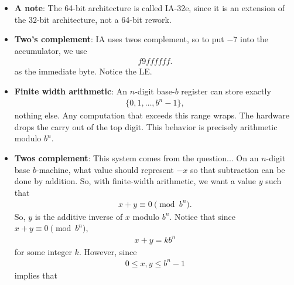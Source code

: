 \documentclass{report}
\begin{document}
\begin{itemize}
\begin{cppcode}
            prog[p_offset++] = 0xb8; // MOV EAX,4
            prog[p_offset++] = 0x04;
            prog[p_offset++] = 0x00;
            prog[p_offset++] = 0x00;
            prog[p_offset++] = 0x00;
            prog[p_offset++] = 0xc3; // RET to caller
            \end{cppcode}
            \bigbreak \noindent 
            Now, the value returned from the call to prog gives the value $4$, as $4$ is the value in the accumulator.
        \item \textbf{A note}: The 64-bit architecture is called IA-32e, since it is an extension of the 32-bit architecture, not a 64-bit rework.
        \item \textbf{Two's complement}: IA uses twos complement, so to put $-7$ into the accumulator, we use
            \begin{align*}
                f9ffffff
            .\end{align*}
            as the immediate byte. Notice the LE. 
        \item \textbf{Finite width arithmetic}: An $n$-digit base-$b$ register  can store exactly
            \begin{align*}
                \{0,1,\dots, b^{n}-1\}
            ,\end{align*}
            nothing else. Any computation that exceeds this range wraps. The hardware drops the carry out of the top digit. This behavior is precisely arithmetic modulo $b^{n}$.
        \item \textbf{Twos complement}: This system comes from the question... On an $n$-digit base $b$-machine, what value should represent $-x$ so that subtraction can be done by addition.
            \bigbreak \noindent 
            So, with finite-width arithmetic, we want a value $y$ such that
            \begin{align*}
                x + y \equiv 0 \pmod{b^{n}}
            .\end{align*}
            So, $y$ is the additive inverse of $x$ modulo $b^{n}$. Notice that since $x+y \equiv 0 \pmod{b^{n}} $, 
            \begin{align*}
                x+y = kb^{n}
            \end{align*}
            for some integer $k$. However, since 
            \begin{align*}
                0 \leq x,y \leq b^{n}-1
            \end{align*}
            implies that 
            \begin{align*}

\end{align*}
\end{itemize}
\end{document}
